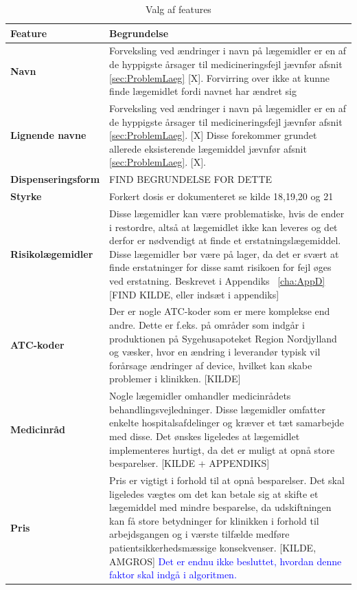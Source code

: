 \begin{longtable}{p{3.5cm}| p{10.5cm}}
	\caption{Valg af features}
	\label{table:features} \\
\cellcolor[HTML]{C0C0C0} {\textbf{Feature}} & \cellcolor[HTML]{C0C0C0} {\textbf{Begrundelse}}  \\ \hline
\textbf{Navn} &  Forveksling ved ændringer i navn på lægemidler er en af de hyppigste årsager til medicineringsfejl jævnfør afsnit \ref{sec:ProblemLaeg} [X]. Forvirring over ikke at kunne finde lægemidlet fordi navnet har ændret sig \\  \hline 
\textbf{Lignende navne} &  Forveksling ved ændringer i navn på lægemidler er en af de hyppigste årsager til medicineringsfejl jævnfør afsnit \ref{sec:ProblemLaeg}. [X] Disse forekommer grundet allerede eksisterende lægemiddel jævnfør afsnit \ref{sec:ProblemLaeg}. [X]. \\  \hline 
\textbf{Dispenseringsform} &  FIND BEGRUNDELSE FOR DETTE  \\ \hline 
\textbf{Styrke} &  Forkert dosis er dokumenteret se kilde 18,19,20 og 21  \\ \hline
\textbf{Risikolægemidler} & Disse lægemidler kan være problematiske, hvis de ender i restordre, altså at lægemidlet ikke kan leveres og det derfor er nødvendigt at finde et erstatningslægemiddel. Disse lægemidler bør være på lager, da det er svært at finde erstatninger for disse samt risikoen for fejl øges ved erstatning. Beskrevet i Appendiks ~\ref{cha:AppD}[FIND KILDE, eller indsæt i appendiks]  \\ \hline 
\textbf{ATC-koder} &  Der er nogle ATC-koder som er mere komplekse end andre. Dette er f.eks. på områder som indgår i produktionen på Sygehusapoteket Region Nordjylland og væsker, hvor en ændring i leverandør typisk vil forårsage ændringer af device, hvilket kan skabe problemer i klinikken. [KILDE] \\ \hline 
\textbf{Medicinråd} & Nogle lægemidler omhandler medicinrådets behandlingsvejledninger. Disse lægemidler omfatter enkelte hospitalsafdelinger og kræver et tæt samarbejde med disse. Det ønskes ligeledes at lægemidlet implementeres hurtigt, da det er muligt at opnå store besparelser. [KILDE + APPENDIKS]\\ \hline 
\textbf{Pris} &  Pris er vigtigt i forhold til at opnå besparelser. Det skal ligeledes vægtes om det kan betale sig at skifte et lægemiddel med mindre besparelse, da udskiftningen kan få store betydninger for klinikken i forhold til arbejdsgangen og i værste tilfælde medføre patientsikkerhedsmæssige konsekvenser. [KILDE, AMGROS] \textcolor{blue}{Det er endnu ikke besluttet, hvordan denne faktor skal indgå i algoritmen.} \\ \hline
    \end{longtable}

